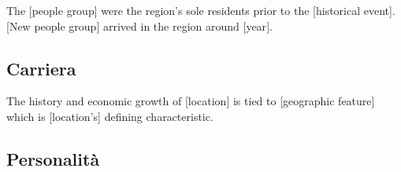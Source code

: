 The {[}people group{]} were the region's sole residents prior to the
{[}historical event{]}. {[}New people group{]} arrived in the region
around {[}year{]}.

\subsection{Carriera}\label{carriera}


The history and economic growth of {[}location{]} is tied to
{[}geographic feature{]} which is {[}location's{]} defining
characteristic.

\subsection{Personalità}\label{personalituxe0}


